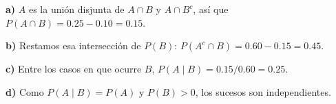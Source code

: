 \textbf{a)} $A$ es la unión disjunta de $A\cap B$
y $A\cap B^c$, así que $P(A\cap B)=0.25-0.10=\boxed{0.15}$.

\textbf{b)} Restamos esa intersección de $P(B)$:
$P(A^c\cap B)=0.60-0.15=\boxed{0.45}$.

\textbf{c)} Entre los casos en que ocurre $B$,
$P(A\mid B)=0.15/0.60=\boxed{0.25}$.

\textbf{d)} Como $P(A\mid B)=P(A)$ y $P(B)>0$,
los sucesos son independientes.
